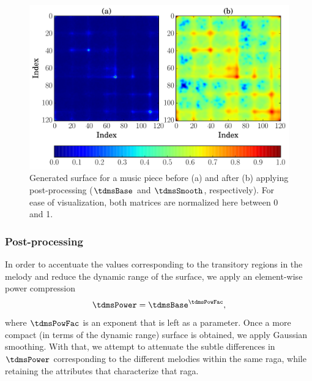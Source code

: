 \begin{figure}[t]
	\begin{center}
		\includegraphics[width=\figSizeEighty]{ch07_ragaRecognition/figures/PSfeature_e59642ca-72bc-466b-bf4b-d82bfbc7b4af.pdf}
	\end{center}\vspace{-1.5em}
	\caption{Generated surface for a music piece before (a) and after (b) applying post-processing ($\tdmsBase$ and $\tdmsSmooth$, respectively). For ease of visualization, both matrices are normalized here between 0 and 1.}
	\label{fig:phase_space_surface}
	\vspace{-0.5em}
\end{figure}

\subsubsection{Post-processing}
\label{sec:tdms_post_processing}

In order to accentuate the values corresponding to the transitory regions in the melody and reduce the dynamic range of the surface, we apply an element-wise power compression
\begin{equation*}
\tdmsPower= \tdmsBase^\tdmsPowFac ,
\end{equation*}
where $\tdmsPowFac$ is an exponent that is left as a parameter. Once a more compact (in terms of the dynamic range) surface is obtained, we apply Gaussian smoothing. With that, we attempt to attenuate the subtle differences in $\tdmsPower$ corresponding to the different melodies within the same \gls{raga}, while retaining the attributes that characterize that \gls{raga}. 

